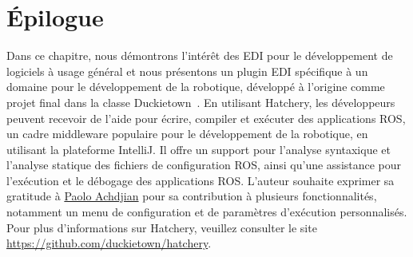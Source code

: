 \section{Épilogue}

Dans ce chapitre, nous démontrons l'intérêt des EDI pour le développement de logiciels à usage général et nous présentons un plugin EDI spécifique à un domaine pour le développement de la robotique, développé à l'origine comme projet final dans la classe Duckietown~\citep{paull2017duckietown}. En utilisant Hatchery, les développeurs peuvent recevoir de l'aide pour écrire, compiler et exécuter des applications ROS, un cadre middleware populaire pour le développement de la robotique, en utilisant la plateforme IntelliJ. Il offre un support pour l'analyse syntaxique et l'analyse statique des fichiers de configuration ROS, ainsi qu'une assistance pour l'exécution et le débogage des applications ROS. L'auteur souhaite exprimer sa gratitude à \href{https://github.com/paoloach}{Paolo Achdjian} pour sa contribution à plusieurs fonctionnalités, notamment un menu de configuration et de paramètres d'exécution personnalisés. Pour plus d'informations sur Hatchery, veuillez consulter le site \url{https://github.com/duckietown/hatchery}.